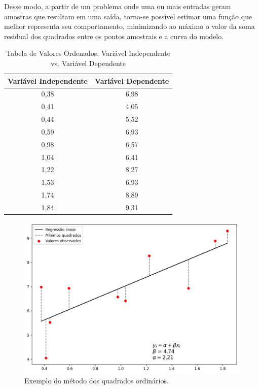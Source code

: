 Desse modo, a partir de um problema onde uma ou mais entradas geram amostras que resultam em uma saída, torna-se possível estimar uma função que melhor representa seu comportamento, minimizando ao máximo o valor da soma residual dos quadrados entre os pontos amostrais e a curva do modelo. 

\begin{table}[h!]
\centering
\begin{tabular}{|c|c|}
\hline
\textbf{Variável Independente} & \textbf{Variável Dependente} \\
\hline
0,38 & 6,98 \\
0,41 & 4,05 \\
0,44 & 5,52 \\
0,59 & 6,93 \\
0,98 & 6,57 \\
1,04 & 6,41 \\
1,22 & 8,27 \\
1,53 & 6,93 \\
1,74 & 8,89 \\
1,84 & 9,31 \\
\hline
\end{tabular}
\caption{Tabela de Valores Ordenados: Variável Independente vs. Variável Dependente}
\end{table}

\begin{figure}[htb]
	\caption{\label{fig:minimos_quadrados}Exemplo do método dos quadrados ordinários.}
	\begin{center}
		\includegraphics[scale=0.6]{figuras/min_sqr.png}
	\end{center}
\end{figure}

